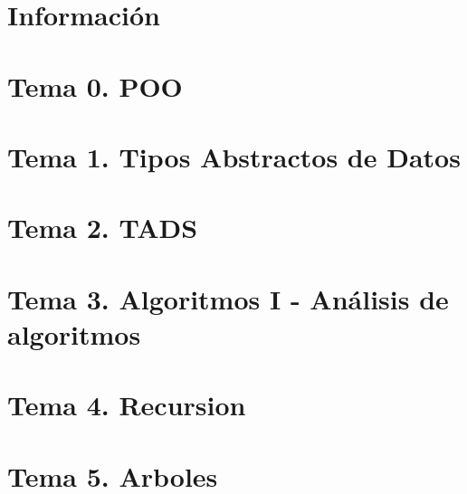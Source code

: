 \documentclass[12pt, twoside, openright]{report} %
\begin{document}
\clearpage
{} %


	
\part{Información}



\part{Tema 0. POO}





\part{Tema 1. Tipos Abstractos de Datos}


\part{Tema 2. TADS}






\part{Tema 3. Algoritmos I - Análisis  de algoritmos}


\part{Tema 4. Recursion}


\part{Tema 5. Arboles}



\end{document}
